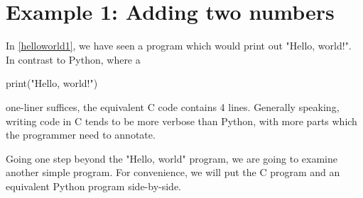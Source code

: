 

\section{Example 1: Adding two numbers}
In \autoref{helloworld1}, we have seen a program which would print out "Hello, world!". In contrast to Python, where a \begin{typewriter}print("Hello, world!")\end{typewriter} one-liner suffices, the equivalent C code contains 4 lines. Generally speaking, writing code in C tends to be more verbose than Python, with more parts which the programmer need to annotate. 

Going one step beyond the "Hello, world" program, we are going to examine another simple program. For convenience, we will put the C program and an equivalent Python program side-by-side.


